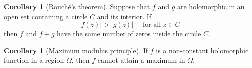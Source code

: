 \documentclass[12pt,a4paper]{book}
\theoremstyle{definition}
\newtheorem{coro}[defn]{Corollary}
\newtheorem{theo}[defn]{Theorem}
\begin{document}
\begin{coro}[Rouché's theorem]
    Suppose that $f$ and $g$ are holomorphic in an open set containing a circle $C$ and its interior. If
$$
|f(z)|>|g(z)| \quad \text { for all } z \in C
$$
then $f$ and $f+g$ have the same number of zeros inside the circle $C$.
\end{coro}
\begin{coro}[Maximum modulus principle]
    If $f$ is a non-constant holomorphic function in a region $\Omega$, then $f$ cannot attain a maximum in $\Omega$.
\end{coro}





\newpage
\end{document}
